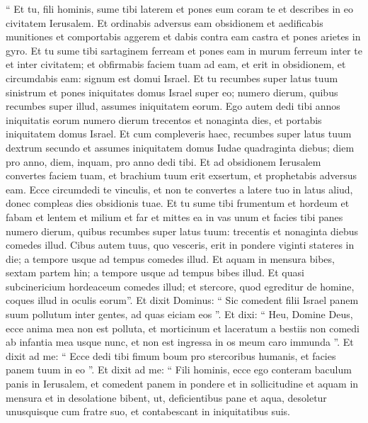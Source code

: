 \begin{biblechapter}
\begin{biblechapter}
\begin{biblechapter}
\begin{biblechapter}
\verse “ Et tu, fili hominis, sume tibi laterem et pones eum coram te et describes in eo civitatem Ierusalem. 
\verse Et ordinabis adversus eam obsidionem et aedificabis munitiones et comportabis aggerem et dabis contra eam castra et pones arietes in gyro. 
\verse Et tu sume tibi sartaginem ferream et pones eam in murum ferreum inter te et inter civitatem; et obfirmabis faciem tuam ad eam, et erit in obsidionem, et circumdabis eam: signum est domui Israel.
 \verse Et tu recumbes super latus tuum sinistrum et pones iniquitates domus Israel super eo; numero dierum, quibus recumbes super illud, assumes iniquitatem eorum. 
\verse Ego autem dedi tibi annos iniquitatis eorum numero dierum trecentos et nonaginta dies, et portabis iniquitatem domus Israel. 
\verse Et cum compleveris haec, recumbes super latus tuum dextrum secundo et assumes iniquitatem domus Iudae quadraginta diebus; diem pro anno, diem, inquam, pro anno dedi tibi. 
\verse Et ad obsidionem Ierusalem convertes faciem tuam, et brachium tuum erit exsertum, et prophetabis adversus eam. 
\verse Ecce circumdedi te vinculis, et non te convertes a latere tuo in latus aliud, donec compleas dies obsidionis tuae.
 \verse Et tu sume tibi frumentum et hordeum et fabam et lentem et milium et far et mittes ea in vas unum et facies tibi panes numero dierum, quibus recumbes super latus tuum: trecentis et nonaginta diebus comedes illud. 
\verse Cibus autem tuus, quo vesceris, erit in pondere viginti stateres in die; a tempore usque ad tempus comedes illud. 
\verse Et aquam in mensura bibes, sextam partem hin; a tempore usque ad tempus bibes illud. 
\verse Et quasi subcinericium hordeaceum comedes illud; et stercore, quod egreditur de homine, coques illud in oculis eorum”. 
\verse Et dixit Dominus: “ Sic comedent filii Israel panem suum pollutum inter gentes, ad quas eiciam eos ”. 
\verse Et dixi: “ Heu, Domine Deus, ecce anima mea non est polluta, et morticinum et laceratum a bestiis non comedi ab infantia mea usque nunc, et non est ingressa in os meum caro immunda ”. 
\verse Et dixit ad me: “ Ecce dedi tibi fimum boum pro stercoribus humanis, et facies panem tuum in eo ”. 
\verse Et dixit ad me: “ Fili hominis, ecce ego conteram baculum panis in Ierusalem, et comedent panem in pondere et in sollicitudine et aquam in mensura et in desolatione bibent, 
\verse ut, deficientibus pane et aqua, desoletur unusquisque cum fratre suo, et contabescant in iniquitatibus suis.
 

\end{biblechapter}
\end{biblechapter}
\end{biblechapter}
\end{biblechapter}
